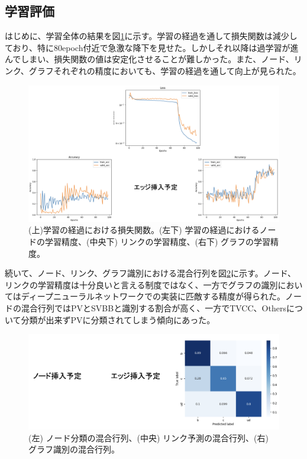 \subsection{学習評価}
はじめに、学習全体の結果を図\ref{gnnoutput}に示す。学習の経過を通して損失関数は減少しており、特に80epoch付近で急激な降下を見せた。しかしそれ以降は過学習が進んでしまい、損失関数の値は安定化させることが難しかった。また、ノード、リンク、グラフそれぞれの精度においても、学習の経過を通して向上が見られた。\\
\begin{figure}[H]
	\begin{center}
 \includegraphics[keepaspectratio, scale=0.3]
 	{Figure/Flavortagging/gnnoutput.png}
 		\caption{(上)学習の経過における損失関数。(左下) 学習の経過におけるノードの学習精度、(中央下) リンクの学習精度、(右下) グラフの学習精度。}
 		\label{gnnoutput}
	\end{center}
\end{figure}
続いて、ノード、リンク、グラフ識別における混合行列を図\ref{gnncm}に示す。ノード、リンクの学習精度は十分良いと言える制度ではなく、一方でグラフの識別においてはディープニューラルネットワークでの実装に匹敵する精度が得られた。ノードの混合行列ではPVとSVBBと識別する割合が高く、一方でTVCC、Othersについて分類が出来ずPVに分類されてしまう傾向にあった。\\
\begin{figure}[H]
	\begin{center}
 \includegraphics[keepaspectratio, scale=0.3]
 	{Figure/Flavortagging/gnncm.png}
 		\caption{(左) ノード分類の混合行列、(中央) リンク予測の混合行列、(右) グラフ識別の混合行列。}
 		\label{gnncm}
	\end{center}
\end{figure}
